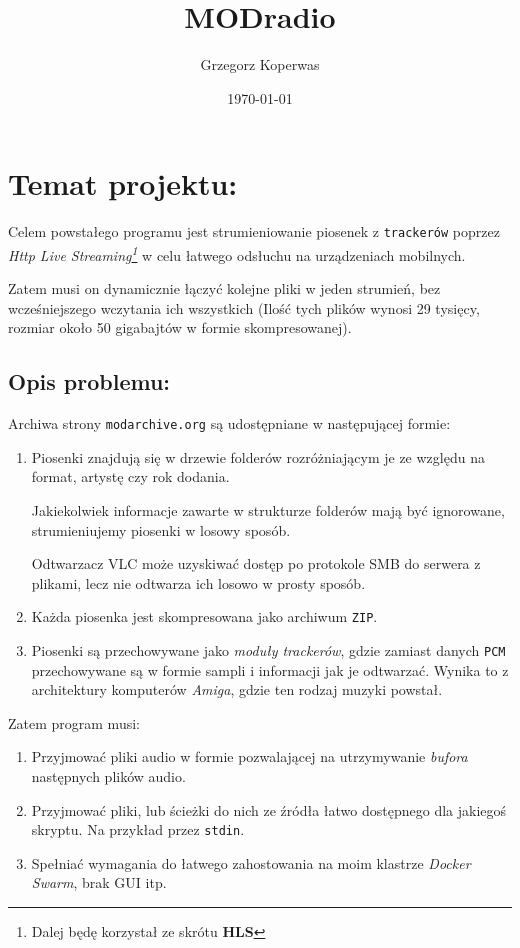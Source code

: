 \documentclass[a4paper,12pt]{article}
\title{MODradio}
\author{Grzegorz Koperwas}
\date{\today}
\begin{document}
\maketitle

\section{Temat projektu:}

Celem powstałego programu jest strumieniowanie piosenek z \texttt{trackerów}
poprzez \emph{Http Live Streaming\footnote{Dalej będę korzystał ze skrótu
\textbf{HLS}}} w celu łatwego odsłuchu na urządzeniach
mobilnych.

Zatem musi on dynamicznie łączyć kolejne pliki w jeden strumień, bez
wcześniejszego wczytania ich wszystkich (Ilość tych plików wynosi 29 tysięcy,
rozmiar około 50 gigabajtów w formie skompresowanej).

\subsection*{Opis problemu:}

Archiwa strony \texttt{modarchive.org} są udostępniane w następującej formie:

\begin{enumerate}
        \item Piosenki znajdują się w drzewie folderów rozróżniającym je ze
            względu na format, artystę czy rok dodania. 

            Jakiekolwiek informacje zawarte w strukturze folderów mają być
            ignorowane, strumieniujemy piosenki w losowy sposób.

            Odtwarzacz VLC
            może uzyskiwać dostęp po protokole SMB do serwera z plikami, lecz
            nie odtwarza ich losowo w prosty sposób.

        \item Każda piosenka jest skompresowana jako archiwum \texttt{ZIP}.

        \item Piosenki są przechowywane jako \emph{moduły trackerów}, gdzie
            zamiast danych \texttt{PCM} przechowywane są w formie sampli i
            informacji jak je odtwarzać. Wynika to z architektury komputerów
            \emph{Amiga}, gdzie ten rodzaj muzyki powstał.
\end{enumerate}

Zatem program musi:

\begin{enumerate}
        \item Przyjmować pliki audio w formie pozwalającej na utrzymywanie
            \emph{bufora} następnych plików audio.
        \item Przyjmować pliki, lub ścieżki do nich ze źródła łatwo dostępnego 
            dla jakiegoś skryptu. Na przykład przez \texttt{stdin}.
        \item Spełniać wymagania do łatwego zahostowania na moim klastrze
            \emph{Docker Swarm}, brak GUI itp.
\end{enumerate}
\end{document}
